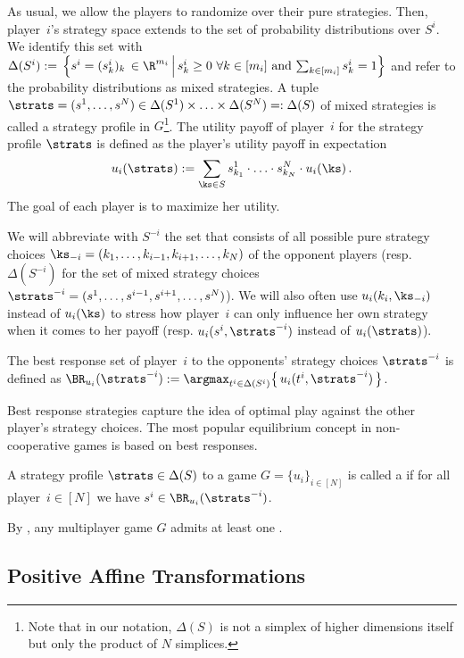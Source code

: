 As usual, we allow the players to randomize over their pure strategies. Then, player~$i$'s strategy space extends to the set of probability distributions over $S^i$. We identify this set with $\Delta(S^i) := \, \Big\{ s^i = (s_k^i)_k \, \in \R^{m_i} \, \Big| \, s_k^i \geq 0 \, \, \forall k \in [m_i] \, \, \text{and} \, \sum_{k \in [m_i]} s_k^i = 1 \Big\}$ and refer to the probability distributions as mixed strategies. A tuple $\strats = (s^1, \ldots, s^N) \in \Delta(S^1) \times \ldots \times \Delta(S^N) =: \Delta(S)$ of mixed strategies is called a strategy profile in $G$\footnote{Note that in our notation, $\Delta(S)$ is not a simplex of higher dimensions itself but only the product of $N$ simplices.}. The utility payoff of player~$i$ for the strategy profile $\strats$ is defined as the player's utility payoff in expectation 
\[ u_i(\strats) := \sum_{\ks \in S} s_{k_1}^1 \cdot \ldots \cdot s_{k_N}^N \cdot u_i(\ks) \, .\]
The goal of each player is to maximize her utility.


We will abbreviate with $S^{-i}$ the set that consists of all possible pure strategy choices $\ks_{-i} = (k_1, \ldots, k_{i-1},k_{i+1}, \ldots, k_N)$ of the opponent players (resp. $\Delta(S^{-i})$ for the set of mixed strategy choices $\strats^{-i} = (s^1, \ldots, s^{i-1},s^{i+1}, \ldots, s^N)$). We will also often use $u_i(k_i,\ks_{-i})$ instead of $u_i(\ks)$ to stress how player~$i$ can only influence her own strategy when it comes to her payoff (resp. $u_i(s^i,\strats^{-i})$ instead of $u_i(\strats)$).
\begin{defn}
The best response set of player~$i$ to the opponents' strategy choices $\strats^{-i}$ is defined as $\BR_{u_i}(\strats^{-i}) :=  \argmax_{t^i \in \Delta(S^i)} \big\{ \, u_i(t^i,\strats^{-i}) \, \big\}$. 
\end{defn} 
Best response strategies capture the idea of optimal play against the other player's strategy choices. The most popular equilibrium concept in non-cooperative games is based on best responses.
\begin{defn}
A strategy profile $\strats \in \Delta(S)$ to a game $G = \{u_i\}_{i \in [N]}$ is called a \NE{} if for all player~$i \in [N]$ we have $s^i \in \BR_{u_i}(\strats^{-i})$.
\end{defn}
\noindent
By \cite{Nash48}, any multiplayer game $G$ admits at least one \NE{}.

\subsection{Positive Affine Transformations} 


